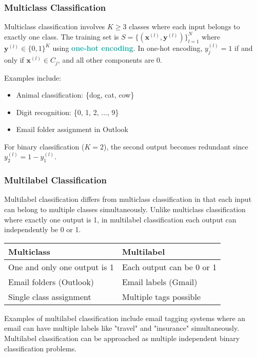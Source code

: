 \documentclass[twoside]{article}
\newcommand{\highlightbluetext}[1]{\textcolor[HTML]{09ACA6}{\textbf{#1}}}
\numberwithin{equation}{section}
\begin{document}
	\subsubsection{Multiclass Classification}
	\label{subsubsec:MulticlassClassification}
	Multiclass classification involves $K \geq 3$ classes where each input belongs to exactly one class. The training set is $S = \{(\mathbf{x}^{(l)}, \mathbf{y}^{(l)})\}_{l=1}^N$ where $\mathbf{y}^{(l)} \in \{0, 1\}^K$ using \highlightbluetext{one-hot encoding}. In one-hot encoding, $y_j^{(l)} = 1$ if and only if $\mathbf{x}^{(l)} \in C_j$, and all other components are 0.

	Examples include:
	\begin{itemize}
		\item Animal classification: \{dog, cat, cow\}
		\item Digit recognition: \{0, 1, 2, ..., 9\}
		\item Email folder assignment in Outlook
	\end{itemize}

	For binary classification ($K = 2$), the second output becomes redundant since $y_2^{(l)} = 1 - y_1^{(l)}$.

	\subsubsection{Multilabel Classification}
	\label{subsubsec:MultilabelClassification}
	Multilabel classification differs from multiclass classification in that each input can belong to multiple classes simultaneously. Unlike multiclass classification where exactly one output is 1, in multilabel classification each output can independently be 0 or 1.

	\begin{center}
		\begin{tabular}{|l|l|}
			\hline
			\textbf{Multiclass} & \textbf{Multilabel} \\
			\hline
			One and only one output is 1 & Each output can be 0 or 1 \\
			Email folders (Outlook) & Email labels (Gmail) \\
			Single class assignment & Multiple tags possible \\
			\hline
		\end{tabular}
	\end{center}

	Examples of multilabel classification include email tagging systems where an email can have multiple labels like "travel" and "insurance" simultaneously. Multilabel classification can be approached as multiple independent binary classification problems.
\end{document}
